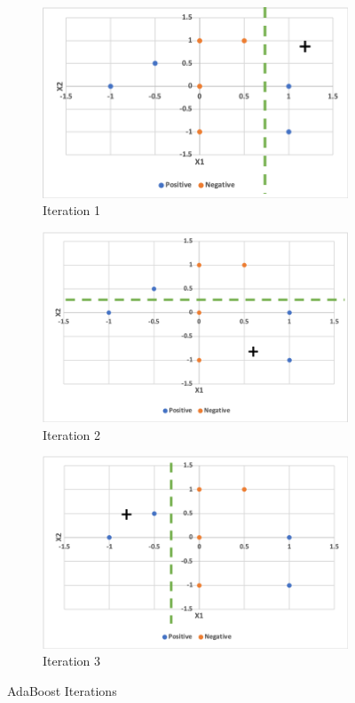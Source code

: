 \documentclass[twoside,12pt]{article}
\begin{document}
\begin{enumerate}
\begin{enumerate}
\begin{itemize}
\begin{figure}
\begin{subfigure}{.33\textwidth}
  \centering
  \includegraphics[width=.8\linewidth]{Iteration1.png}
  \caption{Iteration 1}
  \label{fig:sfig1}
\end{subfigure}%
\begin{subfigure}{.33\textwidth}
  \centering
  \includegraphics[width=.8\linewidth]{Iteration2.png}
  \caption{Iteration 2}
  \label{fig:sfig2}
\end{subfigure}
\begin{subfigure}{.33\textwidth}
  \centering
  \includegraphics[width=.8\linewidth]{Iteration3.png}
  \caption{Iteration 3}
  \label{fig:sfig2}
\end{subfigure}
\caption{AdaBoost Iterations}
\label{fig:fig}
\end{figure}


\end{itemize}
\end{enumerate}
\end{enumerate}
\end{document}
